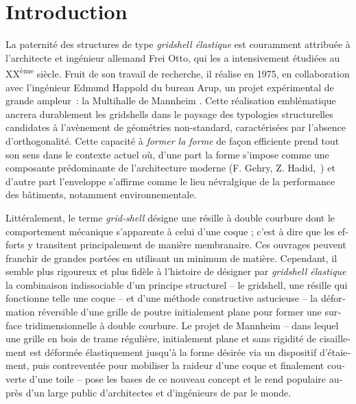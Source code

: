
\newrefsegment
{}
\chapter*{Introduction}\label{chp=intro}

\begin{otherlanguage}{french}


La paternité des structures de type \emph{gridshell élastique} est couramment attribuée à l'architecte et ingénieur allemand Frei Otto, qui les a intensivement étudiées au XX\textsuperscript{ème} siècle. Fruit de son travail de recherche, il réalise en 1975, en collaboration avec l'ingénieur Edmund Happold du bureau Arup, un projet expérimental de grande ampleur~: la Multihalle de Mannheim \cite{IL13,Happold1975}. Cette réalisation emblématique ancrera durablement les gridshells dans le paysage des typologies structurelles candidates à l'avènement de géométries non-standard, caractérisées par l'absence d'orthogonalité. Cette capacité à \emph{former la forme} de façon efficiente prend tout son sens dans le contexte actuel où, d'une part la forme s'impose comme une composante prédominante de l'architecture moderne (F. Gehry, Z. Hadid,~\telp{}) et d'autre part l'enveloppe s'affirme comme le lieu névralgique de la performance des bâtiments, notamment environnementale.

Littéralement, le terme \emph{grid-shell} désigne une résille à double courbure dont le comportement mécanique s'apparente à celui d'une coque ; c'est à dire que les efforts y transitent principalement de manière membranaire. Ces ouvrages peuvent franchir de grandes portées en utilisant un minimum de matière. Cependant, il semble plus rigoureux et plus fidèle à l'histoire de désigner par \emph{gridshell élastique} la combinaison indissociable d'un principe structurel -- le gridshell, une résille qui fonctionne telle une coque -- et d'une méthode constructive astucieuse -- la déformation réversible d'une grille de poutre initialement plane pour former une surface tridimensionnelle à double courbure. Le projet de Mannheim -- dans lequel une grille en bois de trame régulière, initialement plane et sans rigidité de cisaillement est déformée élastiquement jusqu'à la forme désirée via un dispositif d'étaiement, puis contreventée pour mobiliser la raideur d'une coque et finalement couverte d'une toile -- pose les bases de ce nouveau concept et le rend populaire auprès d'un large public d'architectes et d'ingénieurs de par le monde.


\end{otherlanguage}
